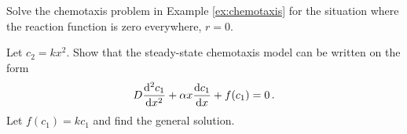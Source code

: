 \begin{exerciseregion}
	\begin{exercise}
		Solve the chemotaxis problem in Example \ref{ex:chemotaxis} for the
		situation where the reaction function is zero everywhere, $r=0$.
	\end{exercise}
	\begin{exercise}
		Let $c_2 = kx^2$. Show that the steady-state chemotaxis model can be written on the form
		\begin{eqnarray}
			D\frac{\mathrm{d}^2 c_1}{\mathrm{d} x^2} + \alpha x \frac{\mathrm{d} c_1}{\mathrm{d} x} + f(c_1) = 0 \, .	
		\end{eqnarray}
		Let $f(c_1) = kc_1$ and find the general solution.
	\end{exercise}
\end{exerciseregion}




















\iffalse
\bigskip


